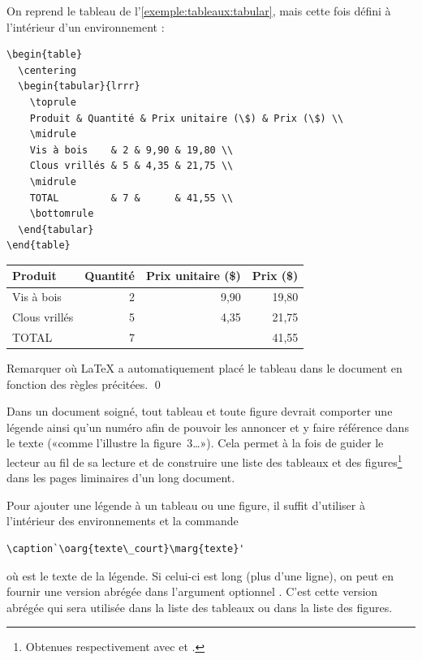 \begin{exemple}
  On reprend le tableau de l'\autoref{exemple:tableaux:tabular}, mais cette
  fois défini à l'intérieur d'un environnement :
\begin{lstlisting}
\begin{table}
  \centering
  \begin{tabular}{lrrr}
    \toprule
    Produit & Quantité & Prix unitaire (\$) & Prix (\$) \\
    \midrule
    Vis à bois    & 2 & 9,90 & 19,80 \\
    Clous vrillés & 5 & 4,35 & 21,75 \\
    \midrule
    TOTAL         & 7 &      & 41,55 \\
    \bottomrule
  \end{tabular}
\end{table}
\end{lstlisting}
  \begin{table}
    \centering
    \begin{tabular}{lrrr}
      \toprule
      Produit & Quantité & Prix unitaire (\$) & Prix (\$) \\
      \midrule
      Vis à bois    & 2 & 9,90 & 19,80 \\
      Clous vrillés & 5 & 4,35 & 21,75 \\
      \midrule
      TOTAL         & 7 &      & 41,55 \\
      \bottomrule
    \end{tabular}
  \end{table}
  Remarquer où {\LaTeX} a automatiquement placé le tableau dans le
  document en fonction des règles précitées. %
  \qed
\end{exemple}

Dans un document soigné, tout tableau et toute figure devrait
comporter une légende ainsi qu'un numéro afin de pouvoir les
annoncer et y faire référence dans le texte («comme l'illustre la
figure~3\dots»). Cela
permet à la fois de guider le lecteur au fil de sa lecture et de
construire une liste des tableaux et des figures\footnote{%
  Obtenues respectivement avec \cmd{\listoftables} et
\cmd{\listoffigures} \citep[section~3]{UL:latex:1}.} %
dans les pages liminaires d'un long document.

Pour ajouter une légende à un tableau ou une figure, il suffit
d'utiliser à l'intérieur des environnements  et 
la commande
\begin{lstlisting}
\caption`\oarg{texte\_court}\marg{texte}'
\end{lstlisting}
où  est le texte de la légende. Si celui-ci est long
(plus d'une ligne), on peut en fournir une version abrégée dans
l'argument optionnel . C'est cette version abrégée
qui sera utilisée dans la liste des tableaux ou dans la liste des
figures.

